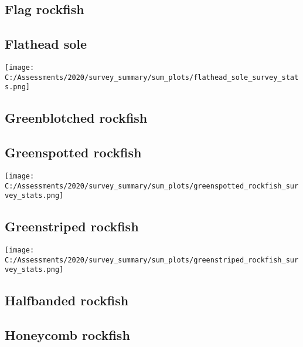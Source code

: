 \documentclass[12pt,]{article}
\begin{document}
\hypertarget{flag-rockfish}{%
\subsection{Flag rockfish}\label{flag-rockfish}}

\FloatBarrier

\hypertarget{flathead-sole}{%
\subsection{Flathead sole}\label{flathead-sole}}

\texttt{[image: C:/Assessments/2020/survey\_summary/sum\_plots/flathead\_sole\_survey\_stats.png]}
\FloatBarrier  

\hypertarget{greenblotched-rockfish}{%
\subsection{Greenblotched rockfish}\label{greenblotched-rockfish}}

\FloatBarrier

\hypertarget{greenspotted-rockfish}{%
\subsection{Greenspotted rockfish}\label{greenspotted-rockfish}}

\texttt{[image: C:/Assessments/2020/survey\_summary/sum\_plots/greenspotted\_rockfish\_survey\_stats.png]}
\FloatBarrier  

\hypertarget{greenstriped-rockfish}{%
\subsection{Greenstriped rockfish}\label{greenstriped-rockfish}}

\texttt{[image: C:/Assessments/2020/survey\_summary/sum\_plots/greenstriped\_rockfish\_survey\_stats.png]}
\FloatBarrier  

\hypertarget{halfbanded-rockfish}{%
\subsection{Halfbanded rockfish}\label{halfbanded-rockfish}}

\FloatBarrier

\hypertarget{honeycomb-rockfish}{%
\subsection{Honeycomb rockfish}\label{honeycomb-rockfish}}
\end{document}
